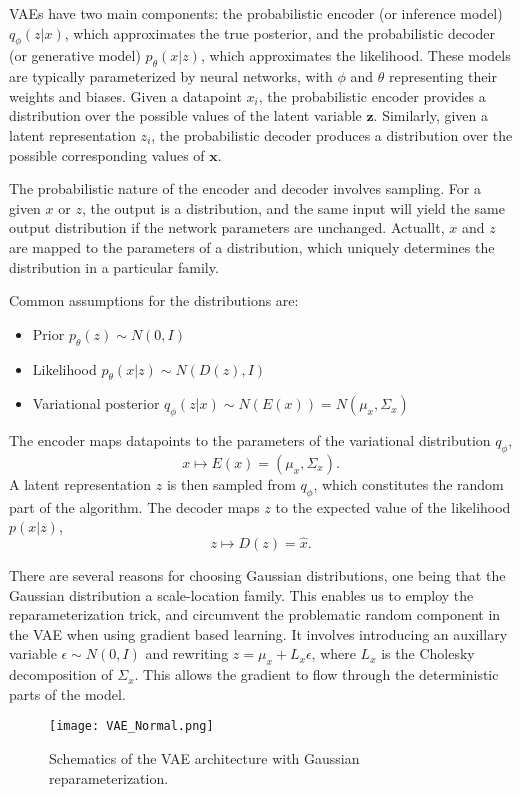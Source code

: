 \documentclass[../../thesis.tex]{subfiles}
\begin{document}
VAEs have two main components: the probabilistic encoder (or inference model) $q_\phi(z|x)$, which approximates the true posterior, and the probabilistic decoder (or generative model) $p_\theta(x|z)$, which approximates the likelihood. These models are typically parameterized by neural networks, with $\phi$ and $\theta$ representing their weights and biases. Given a datapoint $x_i$, the probabilistic encoder provides a distribution over the possible values of the latent variable $\mathbf{z}$. Similarly, given a latent representation $z_i$, the probabilistic decoder produces a distribution over the possible corresponding values of $\mathbf{x}$. \newline

The probabilistic nature of the encoder and decoder involves sampling. For a given $x$ or $z$, the output is a distribution, and the same input will yield the same output distribution if the network parameters are unchanged. Actuallt, $x$ and $z$ are mapped to the parameters of a distribution, which uniquely determines the distribution in a particular family.\newline

Common assumptions for the distributions are:
\begin{itemize}
    \item Prior $p_\theta(z)\sim N(0,I)$
    \item Likelihood $p_\theta(x|z)\sim N(D(z), I)$
    \item Variational posterior $q_\phi(z|x)\sim N(E(x)) = N(\mu_x, \Sigma_x)$
\end{itemize}
The encoder maps datapoints to the parameters of the variational distribution $q_\phi$, 
$$x \mapsto E(x) = (\mu_x, \Sigma_x).$$ 
A latent representation $z$ is then sampled from $q_\phi$, which constitutes the random part of the algorithm. The decoder maps $z$ to the expected value of the likelihood $p(x|z)$, 
$$z \mapsto D(z) = \widehat{x}.$$ 

There are several reasons for choosing Gaussian distributions, one being that the Gaussian distribution a scale-location family. This enables us to employ the reparameterization trick, and circumvent the problematic random component in the VAE when using gradient based learning. It involves introducing an auxillary variable $\epsilon \sim N(0,I)$ and rewriting $z = \mu_x + L_x\epsilon $, where $L_x$ is the Cholesky decomposition of $\Sigma_x$. This allows the gradient to flow through the deterministic parts of the model.
\begin{figure}[h]
    \texttt{[image: VAE\_Normal.png]}
    \centering
    \caption{Schematics of the VAE architecture with Gaussian reparameterization.}
    \label{fig:VAE_Normal}
\end{figure}
\end{document}
